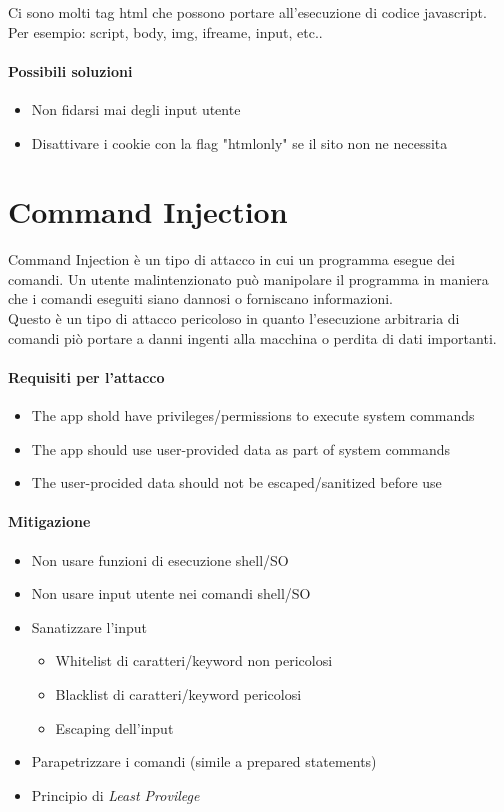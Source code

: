 \documentclass{article}
\begin{document}
Ci sono molti tag html che possono portare all'esecuzione di codice javascript. Per esempio: script, body, img, ifreame, input, etc..

\paragraph{Possibili soluzioni}
\begin{itemize}
    \item Non fidarsi mai degli input utente
    \item Disattivare i cookie con la flag "htmlonly" se il sito non ne necessita
\end{itemize}

\section{Command Injection}
Command Injection è un tipo di attacco in cui un programma esegue dei comandi. Un utente malintenzionato può manipolare il programma in maniera che i comandi eseguiti siano dannosi o forniscano informazioni. \\
Questo è un tipo di attacco pericoloso in quanto l'esecuzione arbitraria di comandi piò portare a danni ingenti alla macchina o perdita di dati importanti.
\paragraph{Requisiti per l'attacco}
\begin{itemize}
    \item The app shold have privileges/permissions to execute system commands
    \item The app should use user-provided data as part of system commands
    \item The user-procided data should not be escaped/sanitized before use
\end{itemize}

\paragraph{Mitigazione}
\begin{itemize}
    \item Non usare funzioni di esecuzione shell/SO
    \item Non usare input utente nei comandi shell/SO
    \item Sanatizzare l'input
        \begin{itemize}
            \item Whitelist di caratteri/keyword non pericolosi
            \item Blacklist di caratteri/keyword pericolosi
            \item Escaping dell'input
        \end{itemize}
    \item Parapetrizzare i comandi (simile a prepared statements)
    \item Principio di \textit{Least Provilege}
\end{itemize}
\end{document}
